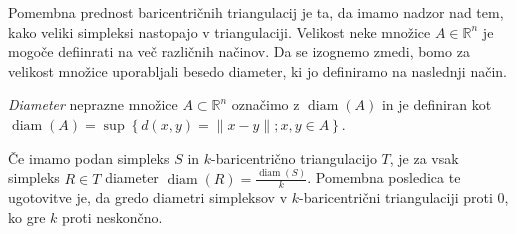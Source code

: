 \documentclass[mat1]{fmfdelo}
\newcommand{\R}{\mathbb R}
\DeclareMathOperator{\diam}{diam}
\newcommand{\0}{\underline{0}}
\begin{document}
Pomembna prednost baricentričnih triangulacij je ta, da imamo nadzor nad tem, kako veliki simpleksi nastopajo v triangulaciji. Velikost neke množice $A \in \R^n$ je mogoče defiinrati na več različnih načinov. Da se izognemo zmedi, bomo za velikost množice uporabljali besedo diameter, ki  jo definiramo na naslednji način.
\begin{definicija}
\emph{Diameter} neprazne množice $A \subset \R^n$ označimo z $\diam(A)$ in je definiran kot $\diam(A) = \sup \left \{ d(x, y) = \| x - y \|; x, y \in A \right \}$.
\end{definicija}
Če imamo podan simpleks $S$ in $k$-baricentrično triangulacijo $T$, je za vsak simpleks $R \in T$ diameter $\diam(R) = \frac{\diam(S)}{k}$. Pomembna posledica te ugotovitve je, da gredo diametri simpleksov v $k$-baricentrični triangulaciji proti $0$, ko gre $k$ proti neskončno.
\end{document}
